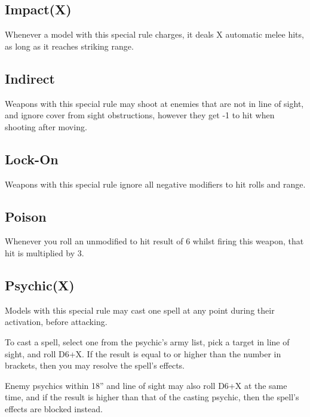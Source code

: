 \documentclass[9pt, a4paper]{extarticle}            %
\begin{document}
\vspace*{0.2cm}

\begin{multicols*}{2}

\subsection{Impact(X)}

Whenever a model with this special rule charges, it deals X automatic melee hits, as long as it reaches striking range.

\subsection{Indirect}

Weapons with this special rule may shoot at enemies that are not in line of sight, and ignore cover from sight obstructions, however they get -1 to hit when shooting after moving.

\subsection{Lock-On}

Weapons with this special rule ignore all negative modifiers to hit rolls and range.

\subsection{Poison}

Whenever you roll an unmodified to hit result of 6 whilst firing this weapon, that hit is multiplied by 3.

\subsection{Psychic(X)}

Models with this special rule may cast one spell at any point during their activation, before attacking.

To cast a spell, select one from the psychic’s army list, pick a target in line of sight, and roll D6+X. If the result is equal to or higher than the number in brackets, then you may resolve the spell’s effects.

Enemy psychics within 18” and line of sight may also roll D6+X at the same time, and if the result is higher than that of the casting psychic, then the spell’s effects are blocked instead.


\end{multicols*}
\end{document}
